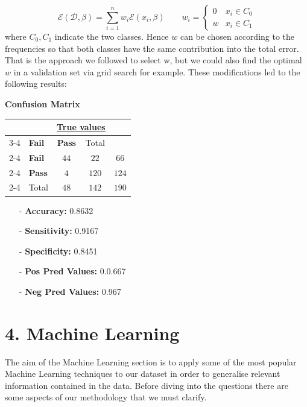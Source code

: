 \documentclass[a4paper, 11pt]{report}
\theoremstyle{definition}
\numberwithin{equation}{section}		%
\numberwithin{table}{section}				%
\begin{document}
\begin{equation}
\mathcal{E}(\mathcal{D}, \beta) = \sum_{i=1}^nw_i\mathcal{E}(x_i, \beta) \quad 
\quad w_i = \begin{cases}
0 & x_i \in C_0\\
w & x_i \in C_1
\end{cases}
\end{equation}
where $C_0, C_1$ indicate the two classes. Hence $w$ can be chosen according to the frequencies so that both classes have the same contribution into the total error. That is the approach we followed to select w, but we could also find the optimal $w$ in a validation set via grid search for example. These modifications led to the following results:
\begin{center}
    \textbf{Confusion Matrix}
\end{center}
\begin{tabular}{l|l|c|c|c}
\multicolumn{2}{c}{}&\multicolumn{2}{c}{\underline{True values}}&\\
\cline{3-4}
\multicolumn{2}{c|}{}&\textbf{Fail}&\textbf{Pass}&\multicolumn{1}{c}{Total}\\
\cline{2-4}
\multirow{\underline{\textit{Predicted Values}}}& \textbf{Fail} & $44$ & $22$ & $66$\\
\cline{2-4}
& \textbf{Pass} & $4$ & $120$ & $124$\\
\cline{2-4}
\multicolumn{1}{c}{} & \multicolumn{1}{c}{Total} & \multicolumn{1}{c}{$48$} & \multicolumn{    1}{c}{$142$} & \multicolumn{1}{c}{$190$}\\
\end{tabular}
\begin{itemize}
    \item[-] \textbf{Accuracy: } 0.8632
    \item[-] \textbf{Sensitivity: } 0.9167
    \item[-] \textbf{Specificity: } 0.8451
    \item[-] \textbf{Pos Pred Values: } 0.0.667
    \item[-] \textbf{Neg Pred Values: } 0.967
\end{itemize}

\newpage

\section*{4. Machine Learning}
The aim of the Machine Learning section is to apply some of the most popular Machine Learning techniques to our dataset in order to generalise relevant information contained in the data. Before diving into the questions there are some aspects of our methodology that we must clarify.\bigskip
\end{document}
